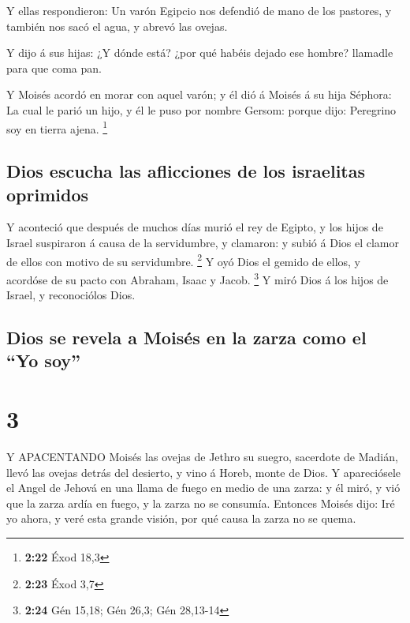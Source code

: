  Y ellas respondieron: Un varón Egipcio nos defendió de
mano de los pastores, y también nos sacó el agua, y abrevó las ovejas.

 Y dijo á sus hijas: ¿Y dónde está? ¿por qué habéis dejado
ese hombre? llamadle para que coma pan.

 Y Moisés acordó en morar con aquel varón; y él dió á
Moisés á su hija Séphora:  La cual le parió un hijo, y él
le puso por nombre Gersom: porque dijo: Peregrino soy en tierra ajena.
\footnote{\textbf{2:22} Éxod 18,3}

\hypertarget{dios-escucha-las-aflicciones-de-los-israelitas-oprimidos}{%
\subsection{Dios escucha las aflicciones de los israelitas
oprimidos}\label{dios-escucha-las-aflicciones-de-los-israelitas-oprimidos}}

 Y aconteció que después de muchos días murió el rey de
Egipto, y los hijos de Israel suspiraron á causa de la servidumbre, y
clamaron: y subió á Dios el clamor de ellos con motivo de su
servidumbre. \footnote{\textbf{2:23} Éxod 3,7}  Y oyó Dios
el gemido de ellos, y acordóse de su pacto con Abraham, Isaac y Jacob.
\footnote{\textbf{2:24} Gén 15,18; Gén 26,3; Gén 28,13-14} 
Y miró Dios á los hijos de Israel, y reconociólos Dios.

\hypertarget{dios-se-revela-a-moisuxe9s-en-la-zarza-como-el-yo-soy}{%
\subsection{Dios se revela a Moisés en la zarza como el ``Yo
soy''}\label{dios-se-revela-a-moisuxe9s-en-la-zarza-como-el-yo-soy}}

\hypertarget{section-2}{%
\section{3}\label{section-2}}

 Y APACENTANDO Moisés las ovejas de Jethro su suegro,
sacerdote de Madián, llevó las ovejas detrás del desierto, y vino á
Horeb, monte de Dios.  Y apareciósele el Angel de Jehová en
una llama de fuego en medio de una zarza: y él miró, y vió que la zarza
ardía en fuego, y la zarza no se consumía.  Entonces Moisés
dijo: Iré yo ahora, y veré esta grande visión, por qué causa la zarza no
se quema.

